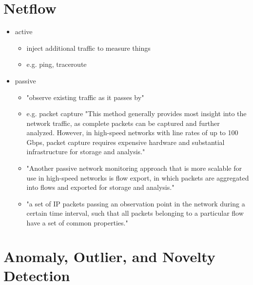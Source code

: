 \section{Netflow}
	\begin{itemize}
		\item active
			\begin{itemize}
				\item inject additional traffic to measure things \parencite{Hofstede2014}
				\item e.g. ping, traceroute
			\end{itemize}
		\item passive
			\begin{itemize}
				\item "observe existing traffic as it passes by" \parencite{Hofstede2014}
				\item e.g. packet capture "This method generally provides most insight into the network traffic, as complete packets can be captured and further analyzed. However, in high-speed networks with line rates of up to 100 Gbps, packet capture requires expensive hardware and substantial infrastructure for storage and analysis." \parencite{Hofstede2014}
				\item "Another passive network monitoring approach that is more scalable for use in high-speed networks is flow export, in which packets are aggregated into flows and exported for storage and analysis." \parencite{Hofstede2014}
				\item  "a set of IP packets passing an observation point in the network during a certain time interval, such that all packets belonging to a particular flow have a set of common properties." \parencite{Claise2013}
				
			\end{itemize}
	\end{itemize}

\section{Anomaly, Outlier, and Novelty Detection}

